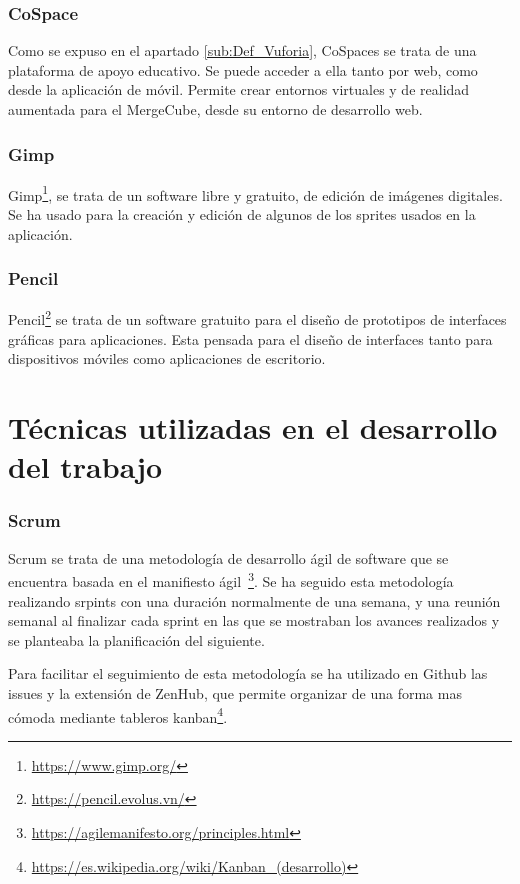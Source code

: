 \subsubsection{CoSpace}
Como se expuso en el apartado \ref{sub:Def_Vuforia}, CoSpaces se trata de una plataforma de apoyo educativo. Se puede acceder a ella tanto por web, como desde la aplicación de móvil. Permite crear entornos virtuales y de realidad aumentada para el MergeCube, desde su entorno de desarrollo web.

\subsubsection{Gimp}
Gimp\footnote{\url{https://www.gimp.org/}}, se trata de un software libre y gratuito, de edición de imágenes digitales. Se ha usado para la creación y edición de algunos de los sprites usados en la aplicación.

\subsubsection{Pencil}
Pencil\footnote{\url{https://pencil.evolus.vn/}} se trata de un software gratuito para el diseño de prototipos de interfaces gráficas para aplicaciones. Esta pensada para el diseño de interfaces tanto para dispositivos móviles como aplicaciones de escritorio.

\section{Técnicas utilizadas en el desarrollo del trabajo}
\subsubsection{Scrum}
Scrum se trata de una metodología de desarrollo ágil de software que se encuentra basada en el manifiesto ágil~\footnote{\url{https://agilemanifesto.org/principles.html}}. Se ha seguido esta metodología realizando srpints con una duración normalmente de una semana, y una reunión semanal al finalizar cada sprint en las que se mostraban los avances realizados y se planteaba la planificación del siguiente.

Para facilitar el seguimiento de esta metodología se ha utilizado en Github las issues y la extensión de ZenHub, que permite organizar de una forma mas cómoda mediante tableros kanban\footnote{\url{https://es.wikipedia.org/wiki/Kanban_(desarrollo)}}.


